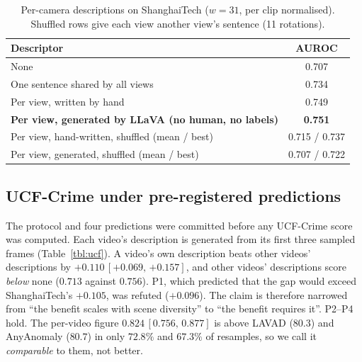 \documentclass[conference,a4paper]{IEEEtran}
\newcommand{\ci}[2]{\,[{#1},\,{#2}]}
\begin{document}
\begin{table}[!t]
\caption{Per-camera descriptions on ShanghaiTech ($w{=}31$, per clip normalised).
Shuffled rows give each view another view's sentence (11 rotations).}
\label{tbl:perview}
\centering
\footnotesize
\begin{tabularx}{\columnwidth}{@{}Z c@{}}
\toprule
\textbf{Descriptor} & \textbf{AUROC} \\
\midrule
None & 0.707 \\
One sentence shared by all views & 0.734 \\
Per view, written by hand & 0.749 \\
\textbf{Per view, generated by LLaVA (no human, no labels)} & \textbf{0.751} \\
Per view, hand-written, shuffled (mean / best) & 0.715 / 0.737 \\
Per view, generated, shuffled (mean / best) & 0.707 / 0.722 \\
\bottomrule
\end{tabularx}
\end{table}

\subsection{UCF-Crime under pre-registered predictions}
The protocol and four predictions were committed before any UCF-Crime score was
computed. Each video's description is generated from its first three sampled
frames (Table~\ref{tbl:ucf}). A video's own description beats other videos'
descriptions by $+0.110\ci{+0.069}{+0.157}$, and other videos' descriptions
score \emph{below} none ($0.713$ against $0.756$). P1, which predicted that the
gap would exceed ShanghaiTech's $+0.105$, was refuted ($+0.096$). The claim is
therefore narrowed from ``the benefit scales with scene diversity'' to ``the
benefit requires it''. P2--P4 hold. The per-video figure $0.824\ci{0.756}{0.877}$
is above LAVAD ($80.3$) and AnyAnomaly ($80.7$) in only $72.8\%$ and $67.3\%$ of
resamples, so we call it \emph{comparable} to them, not better.
\end{document}
